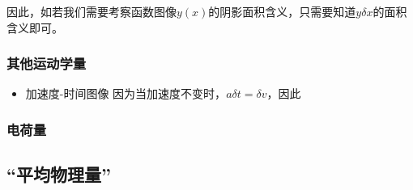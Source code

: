因此，如若我们需要考察函数图像$y(x)$的阴影面积含义，只需要知道$y\delta x$的面积含义即可。
\subsubsection{其他运动学量}
\begin{itemize}
\item 加速度-时间图像 因为当加速度不变时，$a\delta t=\delta v$，因此
\end{itemize}

\subsubsection{电荷量}
\subsection{“平均物理量”}
